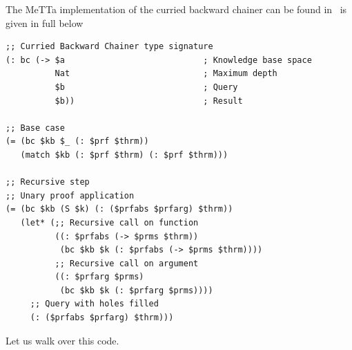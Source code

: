 \documentclass[]{report}
\begin{document}
The MeTTa implementation of the curried backward chainer can be found
in~\cite{CurriedBackwardChainer} is given in full below\pagebreak
\begin{verbatim}
;; Curried Backward Chainer type signature
(: bc (-> $a                            ; Knowledge base space
          Nat                           ; Maximum depth
          $b                            ; Query
          $b))                          ; Result

;; Base case
(= (bc $kb $_ (: $prf $thrm))
   (match $kb (: $prf $thrm) (: $prf $thrm)))

;; Recursive step
;; Unary proof application
(= (bc $kb (S $k) (: ($prfabs $prfarg) $thrm))
   (let* (;; Recursive call on function
          ((: $prfabs (-> $prms $thrm))
           (bc $kb $k (: $prfabs (-> $prms $thrm))))
          ;; Recursive call on argument
          ((: $prfarg $prms)
           (bc $kb $k (: $prfarg $prms))))
     ;; Query with holes filled
     (: ($prfabs $prfarg) $thrm)))
\end{verbatim}
Let us walk over this code.
\end{document}
